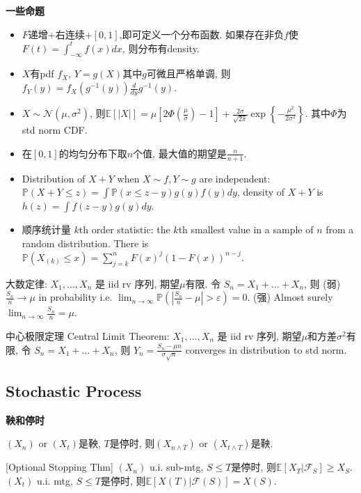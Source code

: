 \documentclass[UTF8]{ctexart}
\begin{document}
\noindent \textbf{一些命题}
\begin{itemize}

\item $F$递增+右连续+$[0,1]$,即可定义一个分布函数. 
如果存在非负$f$使$F(t)=\int_{-\infty}^t f(x)dx$, 则分布有density.

\item $X$有pdf $f_X$, $Y=g(X)$其中$g$可微且严格单调, 则$f_Y(y)=f_X(g^{-1}(y))\frac{d}{dy}g^{-1}(y)$.

\item $X\sim \mathcal{N}(\mu,\sigma^2)$,
则$\mathbb{E}[|X|]=\mu\left[2 \Phi\left(\frac{\mu}{\sigma}\right)-1\right]+
\frac{2 \sigma}{\sqrt{2 \pi}} \exp \left\{-\frac{\mu^{2}}{2 \sigma^{2}}\right\}$.
其中$\Phi$为std norm CDF.

\item 在$[0,1]$的均匀分布下取$n$个值, 最大值的期望是$\frac{n}{n+1}$.

\item Distribution of $X+Y$ when $X\sim f,Y\sim g$ are independent:
$\mathbb{P} (X+Y\leq z)=\int\mathbb{P}(x\leq z-y)g(y)f(y)dy$,
density of $X+Y$ is $h(z)=\int f(z-y)g(y)dy$.

\item 顺序统计量 $k$th order statistic: the $k$th smallest value in a sample of $n$ from a random distribution.
There is $\mathbb{P}(X_{(k)}\leq x)=\sum_{j=k}^n F(x)^j (1-F(x))^{n-j}$.

\end{itemize}

大数定律: 
$X_1,\dots,X_n$ 是 iid rv 序列, 期望$\mu$有限.
令 $S_n = X_1+\dots+X_n$, 则 
(弱) $\frac{S_n}{n}\to\mu$ in probability i.e.
$\lim_{n\to\infty}\mathbb{P}(|\frac{S_n}{n}-\mu|>\varepsilon)=0$.
(强) Almost surely $\lim_{n\to\infty}\frac{S_n}{n}=\mu$.

中心极限定理 Central Limit Theorem: 
$X_1,\dots,X_n$ 是 iid rv 序列, 期望$\mu$和方差$\sigma^2$有限,
令 $S_n = X_1+\dots+X_n$, 则 $Y_n=\frac{S_n-\mu n}{\sigma\sqrt{n}}$
converges in distribution to std norm.


\subsection{Stochastic Process}

\noindent \textbf{鞅和停时}

$(X_n)$ or $(X_t)$是鞅, $T$是停时, 则$(X_{n\wedge T})$ or $(X_{t\wedge T})$是鞅.

[Optional Stopping Thm] $(X_n)$ u.i. sub-mtg, $S\leq T$是停时, 则$\mathbb{E}[X_T|\mathcal{F}_S]\geq X_S$.
$(X_t)$ u.i. mtg, $S\leq T$是停时, 则$\mathbb{E}[X(T)|\mathcal{F}(S)]=X(S)$.
\end{document}
